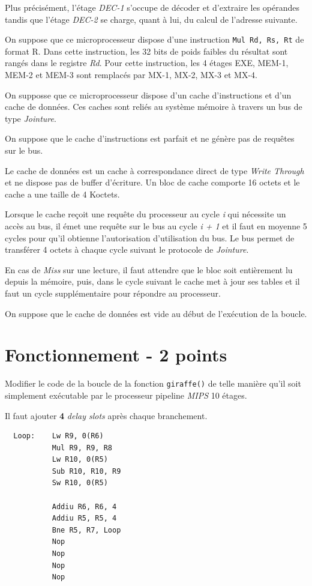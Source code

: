 Plus pr\'ecis\'ement, l'\'etage \textit{DEC-1} s'occupe de d\'ecoder et
d'extraire les op\'erandes tandis que l'\'etage \textit{DEC-2} se charge,
quant \`a lui, du calcul de l'adresse suivante.

On suppose que ce microprocesseur dispose d'une instruction
\texttt{Mul Rd, Rs, Rt} de format R. Dans cette instruction, les 32 bits
de poids faibles du r\'esultat sont rang\'es dans le registre \textit{Rd}.
Pour cette instruction, les 4 \'etages EXE, MEM-1, MEM-2 et MEM-3 sont
remplac\'es par MX-1, MX-2, MX-3 et MX-4.

On supposse que ce microprocesseur dispose d'un cache d'instructions et d'un
cache de donn\'ees. Ces caches sont reli\'es au syst\`eme m\'emoire \`a
travers un bus de type \textit{Jointure}.

On suppose que le cache d'instructions est parfait et ne g\'en\`ere pas de
requ\^etes sur le bus.

Le cache de donn\'ees est un cache \`a correspondance direct de type
\textit{Write Through} et ne dispose pas de buffer d'\'ecriture. Un bloc
de cache comporte 16 octets et le cache a une taille de 4 Koctets.

Lorsque le cache re\c{c}oit une requ\^ete du processeur au cycle \textit{i}
qui n\'ecessite un acc\`es au bus, il \'emet une requ\^ete sur le bus au
cycle \textit{i + 1} et il faut en moyenne 5 cycles pour qu'il obtienne
l'autorisation d'utilisation du bus. Le bus permet de transf\'erer 4 octets
\`a chaque cycle suivant le protocole de \textit{Jointure}.

En cas de \textit{Miss} sur une lecture, il faut attendre que le bloc soit
enti\`erement lu depuis la m\'emoire, puis, dans le cycle suivant le cache
met \`a jour ses tables et il faut un cycle suppl\'ementaire pour r\'epondre
au processeur.

On suppose que le cache de donn\'ees est vide au d\'ebut de l'ex\'ecution
de la boucle.

%
%

\section{Fonctionnement - 2 points}

Modifier le code de la boucle de la fonction \texttt{giraffe()} de telle
mani\`ere qu'il soit simplement ex\'ecutable par le processeur pipeline
\textit{MIPS} 10 \'etages.

\begin{correction}

  Il faut ajouter \textbf{4} \textit{delay slots} apr\`es chaque
  branchement.

  \begin{verbatim}
  Loop:    Lw R9, 0(R6)
           Mul R9, R9, R8
           Lw R10, 0(R5)
           Sub R10, R10, R9
           Sw R10, 0(R5)

           Addiu R6, R6, 4
           Addiu R5, R5, 4
           Bne R5, R7, Loop
           Nop
           Nop
           Nop
           Nop
  \end{verbatim}

\end{correction}


